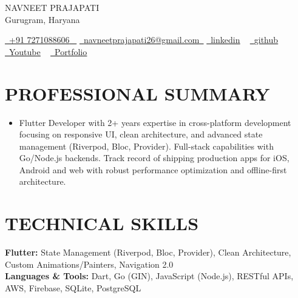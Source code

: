 \documentclass[letterpaper,10pt]{article}
\newcommand{\resumeItem}[1]{
  \item\small{
    {#1 \vspace{-4pt}}
  }
}
\newcommand{\resumeItemListStart}{\begin{itemize}}
\newcommand{\resumeItemListEnd}{\end{itemize}\vspace{-6pt}}
\begin{document}


\begin{center}
    {\Huge \scshape NAVNEET PRAJAPATI} \\ \vspace{1pt}
    Gurugram, Haryana \\ \vspace{1pt}
    \small 
    
    \href{tel:+91 7271088606}{ \raisebox{-0.1\height}\faPhone\ \underline{+91 7271088606} ~} \href{navneetprajapati26@gmail.com}{\raisebox{-0.2\height}\faEnvelope\  \underline{navneetprajapati26@gmail.com}~}
    \href{https://www.linkedin.com/in/navneetprajapati26/}{\raisebox{-0.2\height}\faLinkedin\ \underline{linkedin}} ~
    \href{https://github.com/navneetprajapati26}{\raisebox{-0.2\height}\faGithub\ \underline{github}} ~
    \href{https://www.youtube.com/@asyncapp}{\raisebox{-0.2\height}\faYoutube\ \underline{Youtube}} ~
    \href{https://navneet.asyncapps.com/}{\raisebox{-0.2\height}\faGlobe\ \underline{Portfolio}}
    
    \vspace{-7pt}
\end{center}

\section{PROFESSIONAL SUMMARY}
\resumeItemListStart
\resumeItem{\small{Flutter Developer with 2+ years expertise in cross-platform development focusing on responsive UI, clean architecture, and advanced state management (Riverpod, Bloc, Provider). Full-stack capabilities with Go/Node.js backends. Track record of shipping production apps for iOS, Android and web with robust performance optimization and offline-first architecture.}}
\resumeItemListEnd

\section{TECHNICAL SKILLS}
 \begin{itemize}[leftmargin=0.15in, label={}]
    \small{\item{
     \textbf{\small{Flutter:}}{ \small{State Management (Riverpod, Bloc, Provider), Clean Architecture, Custom Animations/Painters, Navigation 2.0}} \\
     \textbf{\small{Languages \& Tools:}}{ \small{Dart, Go (GIN), JavaScript (Node.js), RESTful APIs, AWS, Firebase, SQLite, PostgreSQL}}
    }}
 \end{itemize}
 \vspace{-15pt}
\end{document}
